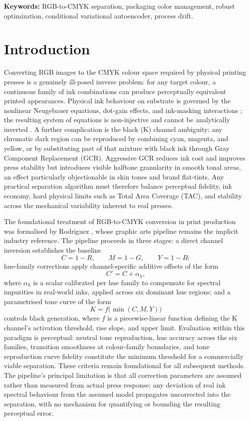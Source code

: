 \documentclass[11pt]{article}
\begin{document}
\noindent\textbf{Keywords:} RGB-to-CMYK separation, packaging color management, robust optimization, conditional variational autoencoder, process drift.

\section{Introduction}

Converting RGB images to the CMYK colour space required by physical printing presses is a genuinely ill-posed inverse problem: for any target colour, a continuous family of ink combinations can produce perceptually equivalent printed appearances. Physical ink behaviour on substrate is governed by the nonlinear Neugebauer equations, dot-gain effects, and ink-masking interactions \cite{ulichney,rodriguez}; the resulting system of equations is non-injective and cannot be analytically inverted \cite{ulichney,rodriguez}. A further complication is the black (K) channel ambiguity: any chromatic dark region can be reproduced by combining cyan, magenta, and yellow, or by substituting part of that mixture with black ink through Gray Component Replacement (GCR). Aggressive GCR reduces ink cost and improves press stability but introduces visible halftone granularity in smooth tonal areas, an effect particularly objectionable in skin tones and brand flat-tints. Any practical separation algorithm must therefore balance perceptual fidelity, ink economy, hard physical limits such as Total Area Coverage (TAC), and stability across the mechanical variability inherent to real presses.

The foundational treatment of RGB-to-CMYK conversion in print production was formalised by Rodriguez \cite{rodriguez}, whose graphic arts pipeline remains the implicit industry reference. The pipeline proceeds in three stages: a direct channel inversion establishes the baseline
\[
C = 1 - R, \qquad M = 1 - G, \qquad Y = 1 - B;
\]
hue-family corrections apply channel-specific additive offsets of the form
\[
C' = C + \alpha_h,
\]
where $\alpha_h$ is a scalar calibrated per hue family to compensate for spectral impurities in real-world inks, applied across six dominant hue regions; and a parametrised tone curve of the form
\[
K = f\bigl(\min(C,M,Y)\bigr)
\]
controls black generation, where $f$ is a piecewise-linear function defining the K channel's activation threshold, rise slope, and upper limit. Evaluation within this paradigm is perceptual: neutral tone reproduction, hue accuracy across the six families, transition smoothness at colour-family boundaries, and tone reproduction curve fidelity constitute the minimum threshold for a commercially viable separation. These criteria remain foundational for all subsequent methods. The pipeline's principal limitation is that all correction parameters are assumed rather than measured from actual press response; any deviation of real ink spectral behaviour from the assumed model propagates uncorrected into the separation, with no mechanism for quantifying or bounding the resulting perceptual error.
\end{document}
